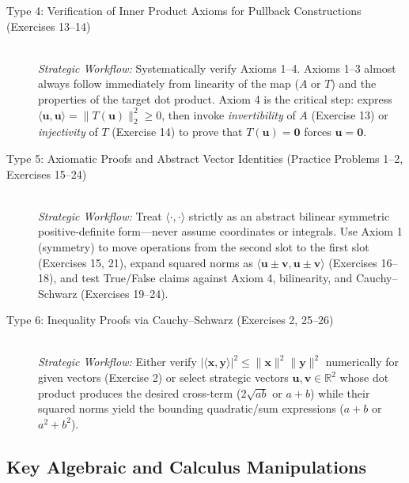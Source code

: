 \documentclass[11pt, letterpaper]{article}
\theoremstyle{definition}
\theoremstyle{remark}
\begin{document}
\begin{description}
    \item[Type 4: Verification of Inner Product Axioms for Pullback Constructions (Exercises 13--14)] \leavevmode \\
    \emph{Strategic Workflow:} Systematically verify Axioms 1--4. Axioms 1--3 almost always follow immediately from linearity of the map ($A$ or $T$) and the properties of the target dot product. Axiom 4 is the critical step: express $\langle \mathbf{u}, \mathbf{u} \rangle = \|T(\mathbf{u})\|_2^2 \ge 0$, then invoke \emph{invertibility} of $A$ (Exercise 13) or \emph{injectivity} of $T$ (Exercise 14) to prove that $T(\mathbf{u}) = \mathbf{0}$ forces $\mathbf{u} = \mathbf{0}$.

    \item[Type 5: Axiomatic Proofs and Abstract Vector Identities (Practice Problems 1--2, Exercises 15--24)] \leavevmode \\
    \emph{Strategic Workflow:} Treat $\langle \cdot, \cdot \rangle$ strictly as an abstract bilinear symmetric positive-definite form—never assume coordinates or integrals. Use Axiom 1 (symmetry) to move operations from the second slot to the first slot (Exercises 15, 21), expand squared norms as $\langle \mathbf{u} \pm \mathbf{v}, \mathbf{u} \pm \mathbf{v} \rangle$ (Exercises 16--18), and test True/False claims against Axiom 4, bilinearity, and Cauchy--Schwarz (Exercises 19--24).

    \item[Type 6: Inequality Proofs via Cauchy--Schwarz (Exercises 2, 25--26)] \leavevmode \\
    \emph{Strategic Workflow:} Either verify $|\langle \mathbf{x}, \mathbf{y} \rangle|^2 \le \|\mathbf{x}\|^2 \|\mathbf{y}\|^2$ numerically for given vectors (Exercise 2) or select strategic vectors $\mathbf{u}, \mathbf{v} \in \mathbb{R}^2$ whose dot product produces the desired cross-term ($2\sqrt{ab}$ or $a+b$) while their squared norms yield the bounding quadratic/sum expressions ($a+b$ or $a^2+b^2$).
\end{description}

\subsection{Key Algebraic and Calculus Manipulations}
\end{document}
